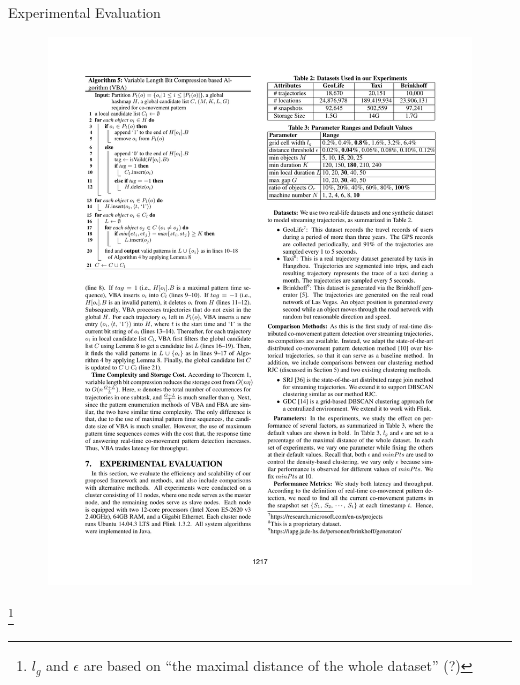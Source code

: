 \documentclass{beamer}
\newcommand\blfootnote[1]{%

  \begingroup

  \renewcommand\thefootnote{}\footnote{#1}%

  \addtocounter{footnote}{-1}%

  \endgroup

}
\begin{document}
\begin{frame}{Experimental Evaluation}
    \centering
    \begin{figure}
        \includegraphics[trim=11cm 19.5cm 1.5cm 4.3cm, clip, width=1\textwidth]{figures/Chen_p1217}
    \end{figure}
    \blfootnote{\tiny{$l_g$ and $\epsilon$ are based on ``the maximal distance of the whole dataset'' (?)}}
\end{frame}
\end{document}
